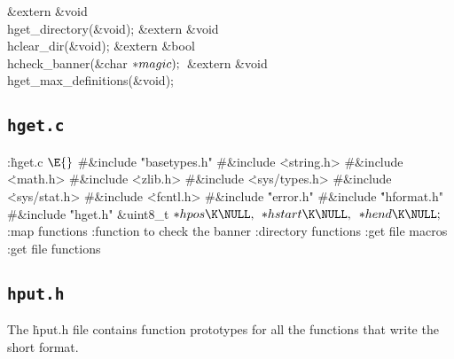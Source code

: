 \&{extern} \&{void} \\{hget\_directory}(\&{void});\6
\&{extern} \&{void} \\{hclear\_dir}(\&{void});\6
\&{extern} \&{bool} \\{hcheck\_banner}(\&{char} ${}{*}\index{magic+\\{magic}}\\{magic});{}$\6
\&{extern} \&{void} \\{hget\_max\_definitions}(\&{void});
\Y
\fi




\subsection{{\tt hget.c}}
\Y\B\4:\.{hget.c }\X${}\E{}$\6
\8\#\&{include} \.{"basetypes.h"}\6
\8\#\&{include} \.{<string.h>}\6
\8\#\&{include} \.{<math.h>}\6
\8\#\&{include} \.{<zlib.h>}\6
\8\#\&{include} \.{<sys/types.h>}\6
\8\#\&{include} \.{<sys/stat.h>}\6
\8\#\&{include} \.{<fcntl.h>}\6
\8\#\&{include} \.{"error.h"}\6
\8\#\&{include} \.{"hformat.h"}\6
\8\#\&{include} \.{"hget.h"}\6
\&{uint8\_t} ${}{*}\index{hpos+\\{hpos}}\\{hpos}\K\NULL,{}$ ${}{*}\index{hstart+\\{hstart}}\\{hstart}\K\NULL,{}$ ${}{*}\index{hend+\\{hend}}\\{hend}\K\NULL;{}$\7
:map functions\X\6
:function to check the banner\X\6
:directory functions\X\6
:get file macros\X\6
:get file functions\X
\Y
\fi


\subsection{{\tt hput.h}}
The \.{hput.h} file contains function prototypes for all the functions
that write the short format.


